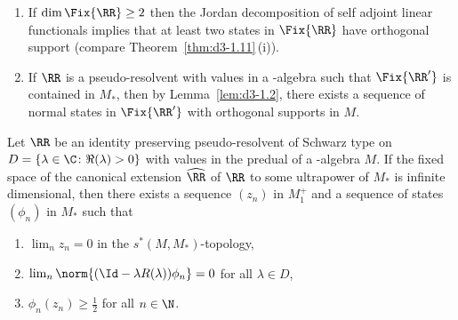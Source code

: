 \begin{remark}\label{rem:d4-4.2}
\begin{enumerate}[\upshape (i), wide, labelindent=.25em]
\item
If\/ $ \dim \Fix{\RR} \geq 2 $  then the Jordan decomposition of self adjoint linear functionals implies that at least two states in $ \Fix{\RR} $  have orthogonal support (compare Theorem~\ref{thm:d3-1.11}\,(i)).

\item
If\/ $ \RR $  is a pseudo-resolvent with values in a \WA-algebra such that $ \Fix{\RR'} $  is contained in $ M_{*} $,  then by Lemma~\ref{lem:d3-1.2}, there exists a sequence of normal states in $ \Fix{\RR'} $  with orthogonal supports in $ M $.
\end{enumerate}
\end{remark}
\begin{lemma}\label{lem:d4-4.3}
Let $ \RR $  be an identity preserving pseudo-resolvent of Schwarz type on $ D = \{\lambda \in \C \colon  \Re(\lambda) > 0\} $  with values in the predual of a \WA-algebra $ M $.
If the fixed space of the canonical extension $ \widehat{\RR} $  of\/ $ \RR $  to some ultrapower of\/ $ M_{*} $  is infinite dimensional, then there exists a sequence $ (z_{n}) $  in $ M_{1}^{+} $  and a sequence of states $ (\phi_{n}) $  in $ M_{*} $  such that
\begin{enumerate}[\upshape (i)]

\item\label{item:d4-4.3-i}
$ \lim_{n} z_{n} = 0 $  in the $ s^{*}(M,M_{*}) $-topology,

\item\label{item:d4-4.3-ii}
$ \lim_{n} \norm{(\Id - \lambda R(\lambda))\phi_{n}} = 0 $  for all $ \lambda \in D $,

\item\label{item:d4-4.3-iii}
$ \phi_{n}(z_{n}) \geq \frac{1}{2} $  for all $ n \in \N $. 
\end{enumerate}
\end{lemma}
